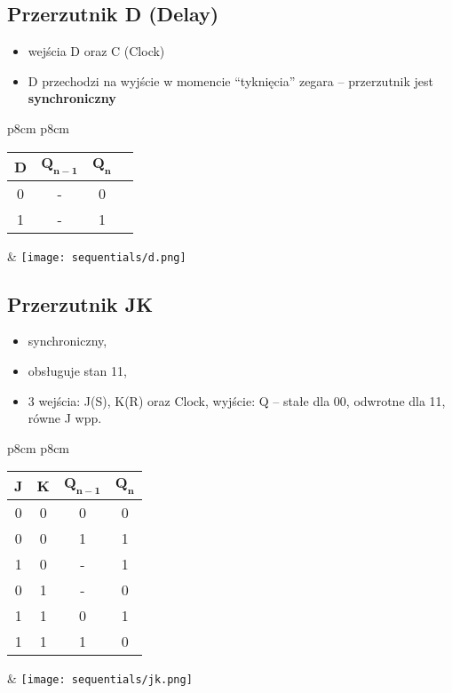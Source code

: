 \documentclass[main.tex]{subfiles}
\begin{document}
    \subsection{Przerzutnik D (Delay)}
    \begin{itemize}[noitemsep]
        \item wejścia D oraz C (Clock)
        \item D przechodzi na wyjście w momencie ``tyknięcia'' zegara -- przerzutnik jest \textbf{synchroniczny}
    \end{itemize}

    \begin{table}[H]
        \center
        \begin{tabular}{p{8cm} p{8cm}}
            \begin{tabular}{|c|c|c|c|}
                \hline
                \textbf{D} & $\mathbf{Q_{n-1}}$ & $\mathbf{Q_n}$ \\ \hline
                0 & - & 0              \\ \hline
                1 & - & 1              \\ \hline
            \end{tabular}
            &
            \texttt{[image: sequentials/d.png]}
        \end{tabular}
    \end{table}

    \subsection{Przerzutnik JK}
    \begin{itemize}[noitemsep]
        \item synchroniczny,
        \item obsługuje stan 11,
        \item  3 wejścia: J(S), K(R) oraz Clock, wyjście: Q -- stałe dla 00, odwrotne dla 11, równe J wpp.
    \end{itemize}

    \begin{table}[H]
        \center
        \begin{tabular}{p{8cm} p{8cm}}
            \begin{tabular}{|c|c|c|c|}
                \hline
                \textbf{J} & \textbf{K} & $\mathbf{Q_{n-1}}$ & $\mathbf{Q_n}$ \\ \hline
                0 & 0 & 0 & 0              \\ \hline
                0 & 0 & 1 & 1              \\ \hline
                1 & 0 & - & 1              \\ \hline
                0 & 1 & - & 0              \\ \hline
                1 & 1 & 0 & 1              \\ \hline
                1 & 1 & 1 & 0              \\ \hline
            \end{tabular}
            &
            \texttt{[image: sequentials/jk.png]}
        \end{tabular}
    \end{table}
\end{document}
